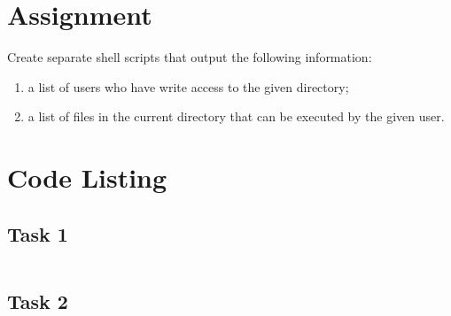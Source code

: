 \documentclass[en]{labreport}
\begin{document}
\maketitlepage

\section*{Assignment}

Create separate shell scripts that output the following information:
\begin{enumerate}
\item a list of users who have write access to the given directory;
\item a list of files in the current directory that can be executed by the given user.
\end{enumerate}

\section*{Code Listing}

\subsection*{Task 1}

\inputminted[linenos, fontsize=\scriptsize]{bash}{task1.sh}

\newpage

\subsection*{Task 2}

\inputminted[linenos, fontsize=\scriptsize]{bash}{task2.sh}
\end{document}
